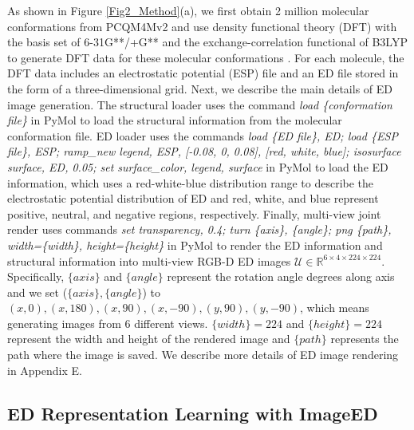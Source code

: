 \documentclass{article}
\begin{document}
As shown in Figure \ref{Fig2_Method}(a), we first obtain 2 million molecular conformations from PCQM4Mv2 \cite{hu2021ogb} and use density functional theory (DFT) with the basis set of 6-31G**/+G** and the exchange-correlation functional of B3LYP to generate DFT data for these molecular conformations \cite{sud2016mayachemtools}. For each molecule, the DFT data includes an electrostatic potential (ESP) file and an ED file stored in the form of a three-dimensional grid. Next, we describe the main details of ED image generation. The structural loader uses the command \textit{load \{conformation file\}} in PyMol \cite{delano2002pymol} to load the structural information from the molecular conformation file. ED loader uses the commands \textit{load \{ED file\}, ED; load \{ESP file\}, ESP; ramp\_new legend, ESP, [-0.08, 0, 0.08], [red, white, blue]; isosurface surface, ED, 0.05; set surface\_color, legend, surface} in PyMol to load the ED information, which uses a red-white-blue distribution range to describe the electrostatic potential distribution of ED and red, white, and blue represent positive, neutral, and negative regions, respectively. Finally, multi-view joint render uses commands \textit{set transparency, 0.4; turn \{axis\}, \{angle\}; png \{path\}, width=\{width\}, height=\{height\}} in PyMol to render the ED information and structural information into multi-view RGB-D ED images $\mathcal{U}\in\mathbb{R}^{6\times 4\times 224\times 224}$. Specifically, $\{axis\}$ and $\{angle\}$ represent the rotation angle degrees along axis and we set ($\{axis\}, \{angle\}$) to $(x, 0), (x, 180), (x, 90), (x, -90), (y, 90), (y, -90)$, which means generating images from 6 different views. $\{width\}=224$ and $\{height\}=224$ represent the width and height of the rendered image and $\{path\}$ represents the path where the image is saved. We describe more details of ED image rendering in Appendix E.


\subsection{ED Representation Learning with ImageED}
\label{sec:ED_representation_learning}
\end{document}
